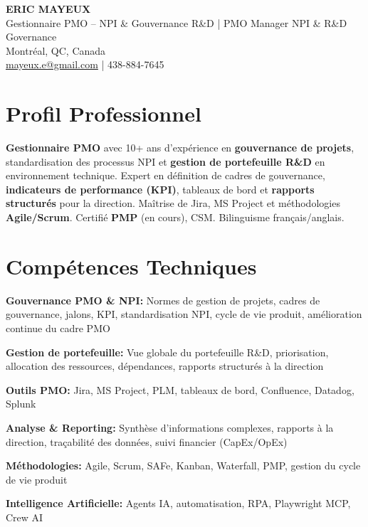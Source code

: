 \documentclass[11pt,a4paper]{article}
\begin{document}
\begin{center}
    {\LARGE \textbf{ERIC MAYEUX}}\\
    \vspace{4pt}
    {\large Gestionnaire PMO -- NPI \& Gouvernance R\&D | PMO Manager NPI \& R\&D Governance}\\
    \vspace{4pt}
    Montréal, QC, Canada\\
    \href{mailto:mayeux.e@gmail.com}{mayeux.e@gmail.com} | 438-884-7645
\end{center}

\vspace{8pt}

\section*{Profil Professionnel}
\noindent
\textbf{Gestionnaire PMO} avec 10+ ans d'expérience en \textbf{gouvernance de projets}, standardisation des processus NPI et \textbf{gestion de portefeuille R\&D} en environnement technique. Expert en définition de cadres de gouvernance, \textbf{indicateurs de performance (KPI)}, tableaux de bord et \textbf{rapports structurés} pour la direction. Maîtrise de Jira, MS Project et méthodologies \textbf{Agile/Scrum}. Certifié \textbf{PMP} (en cours), CSM. Bilinguisme français/anglais.

\section*{Compétences Techniques}

\textbf{Gouvernance PMO \& NPI:} Normes de gestion de projets, cadres de gouvernance, jalons, KPI, standardisation NPI, cycle de vie produit, amélioration continue du cadre PMO

\textbf{Gestion de portefeuille:} Vue globale du portefeuille R\&D, priorisation, allocation des ressources, dépendances, rapports structurés à la direction

\textbf{Outils PMO:} Jira, MS Project, PLM, tableaux de bord, Confluence, Datadog, Splunk

\textbf{Analyse \& Reporting:} Synthèse d'informations complexes, rapports à la direction, traçabilité des données, suivi financier (CapEx/OpEx)

\textbf{Méthodologies:} Agile, Scrum, SAFe, Kanban, Waterfall, PMP, gestion du cycle de vie produit

\textbf{Intelligence Artificielle:} Agents IA, automatisation, RPA, Playwright MCP, Crew AI
\end{document}

